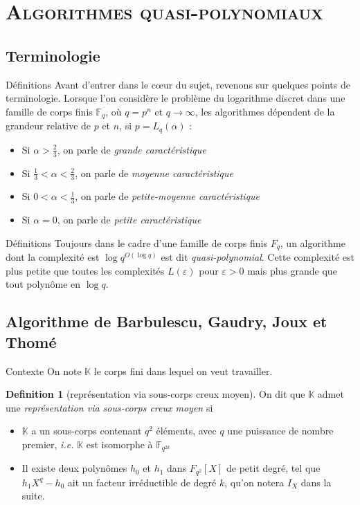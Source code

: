 \documentclass[xcolor=x11names,compress]{beamer}
\theoremstyle{break}
\theoremstyle{sc}
\theoremstyle{definition}
\newtheorem{defi}[thm]{Definition}
\theoremstyle{remark}
\newcommand{\ie}{\emph{i.e. }}
\begin{document}
\section{\scshape Algorithmes quasi-polynomiaux}
\subsection{Terminologie}
\begin{frame}{Définitions}
  Avant d'entrer dans le cœur du sujet, revenons sur quelques points de
  terminologie. Lorsque l'on considère le problème du logarithme discret dans
  une famille de corps finis $\mathbb{F}_{q}$, où $q=p^n$ et $q\to\infty$, les
  algorithmes dépendent de la grandeur relative de $p$ et $n$, si
  $p=L_q(\alpha)$ :
  \begin{itemize}
    \item Si $\alpha>\frac{2}{3}$, on parle de \emph{grande caractéristique}
    \item Si $\frac{1}{3} <\alpha<\frac{2}{3}$, on parle de \emph{moyenne caractéristique}
    \item Si $0 <\alpha<\frac{1}{3}$, on parle de \emph{petite-moyenne caractéristique}
    \item Si $\alpha = 0$, on parle de \emph{petite caractéristique}
  \end{itemize}
\end{frame}


\begin{frame}{Définitions}
 Toujours dans le cadre d'une famille de corps finis $F_q$, un algorithme dont
 la complexité est  $\log q^{O(\log q)}$ est dit \emph{quasi-polynomial}. Cette
 complexité est plus petite que toutes les complexités $L(\varepsilon)$ pour
 $\varepsilon>0$ mais plus grande que tout polynôme en $\log q$.
\end{frame}

\subsection{Algorithme de Barbulescu, Gaudry, Joux et Thomé}

\begin{frame}{Contexte}
  On note $\mathbb{K}$ le corps fini dans lequel on veut travailler.

  \begin{defi}[représentation via sous-corps creux moyen]
    On dit que $\mathbb{K}$ admet une \emph{représentation via sous-corps creux
    moyen} si
    \begin{itemize}
      \item $\mathbb{K}$ a un sous-corps contenant $q^2$ éléments, avec $q$ une
        puissance de nombre premier, \ie
        $\mathbb{K}$ est isomorphe à $\mathbb{F}_{q^{2k}}$
      \item Il existe deux polynômes $h_0$ et $h_1$ dans $F_{q^2}[X]$ de petit
        degré, tel que $h_1X^q-h_0$ ait un facteur irréductible de degré $k$,
        qu'on notera $I_X$ dans la suite.
    \end{itemize}
  \end{defi}
\end{frame}
\end{document}
